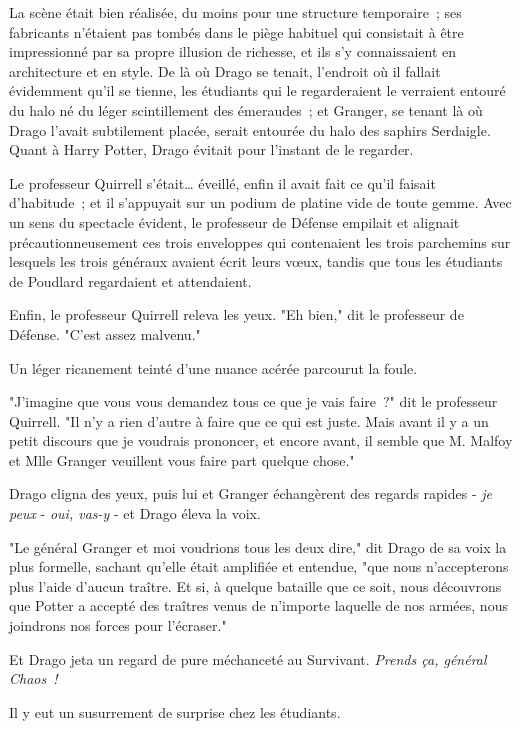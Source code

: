 \later

La scène était bien réalisée, du moins pour une structure temporaire~; ses fabricants n'étaient pas tombés dans le piège habituel qui consistait à être impressionné par sa propre illusion de richesse, et ils s'y connaissaient en architecture et en style. De là où Drago se tenait, l'endroit où il fallait évidemment qu'il se tienne, les étudiants qui le regarderaient le verraient entouré du halo né du léger scintillement des émeraudes~; et Granger, se tenant là où Drago l'avait subtilement placée, serait entourée du halo des saphirs Serdaigle. Quant à Harry Potter, Drago évitait pour l'instant de le regarder.

Le professeur Quirrell s'était… éveillé, enfin il avait fait ce qu'il faisait d'habitude~; et il s'appuyait sur un podium de platine vide de toute gemme. Avec un sens du spectacle évident, le professeur de Défense empilait et alignait précautionneusement ces trois enveloppes qui contenaient les trois parchemins sur lesquels les trois généraux avaient écrit leurs vœux, tandis que tous les étudiants de Poudlard regardaient et attendaient.

Enfin, le professeur Quirrell releva les yeux. "Eh bien," dit le professeur de Défense. "C'est assez malvenu."

Un léger ricanement teinté d'une nuance acérée parcourut la foule.

"J'imagine que vous vous demandez tous ce que je vais faire~?" dit le professeur Quirrell. "Il n'y a rien d'autre à faire que ce qui est juste. Mais avant il y a un petit discours que je voudrais prononcer, et encore avant, il semble que M. Malfoy et Mlle Granger veuillent vous faire part quelque chose."

Drago cligna des yeux, puis lui et Granger échangèrent des regards rapides - \emph{je peux} - \emph{oui, vas-y} - et Drago éleva la voix.

"Le général Granger et moi voudrions tous les deux dire," dit Drago de sa voix la plus formelle, sachant qu'elle était amplifiée et entendue, "que nous n'accepterons plus l'aide d'aucun traître. Et si, à quelque bataille que ce soit, nous découvrons que Potter a accepté des traîtres venus de n'importe laquelle de nos armées, nous joindrons nos forces pour l'écraser."

Et Drago jeta un regard de pure méchanceté au Survivant. \emph{Prends ça, général Chaos~!}

Il y eut un susurrement de surprise chez les étudiants.

